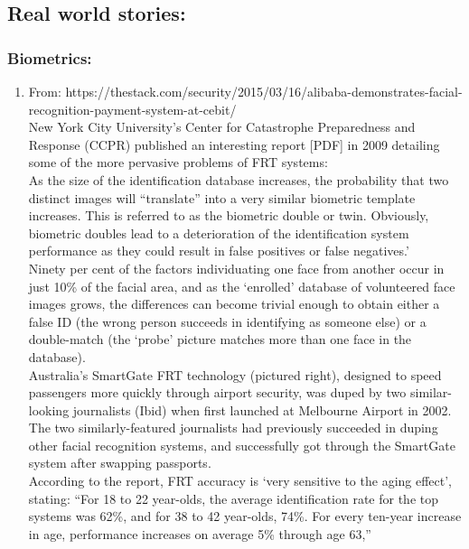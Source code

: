 \documentclass[11pt]{article}
\begin{document}
\subsection*{Real world stories:}

\subsubsection*{Biometrics:}
\begin{enumerate}
 \item From: https://thestack.com/security/2015/03/16/alibaba-demonstrates-facial-recognition-payment-system-at-cebit/\\
 New York City University’s Center for Catastrophe Preparedness and Response (CCPR) published an interesting report [PDF] in 2009 detailing some of 
the more pervasive problems of FRT systems:\\
As the size of the identification database increases, the probability that two distinct images will “translate” into a very similar biometric 
template 
increases. This is referred to as the biometric double or twin. Obviously, biometric doubles lead to a deterioration of the identification system 
performance as they could result in false positives or false negatives.’\\

Ninety per cent of the factors individuating one face from another occur in just 10\% of the facial area, and as the ‘enrolled’ database of 
volunteered face images grows, the differences can become trivial enough to obtain either a false ID (the wrong person succeeds in identifying as 
someone else) or a double-match (the ‘probe’ picture matches more than one face in the database).\\

Australia’s SmartGate FRT technology (pictured right), designed to speed passengers more quickly through airport security, was duped by two 
similar-looking journalists (Ibid) when first launched at Melbourne Airport in 2002. The two similarly-featured journalists had previously succeeded 
in duping other facial recognition systems, and successfully got through the SmartGate system after swapping passports.\\

According to the report, FRT accuracy is ‘very sensitive to the aging effect’, stating: “For 18 to 22 year-olds, the average identification rate for 
the top systems was 62\%, and for 38 to 42 year-olds, 74\%. For every ten-year increase in age, performance increases on average 5\% through age 63,”
\end{enumerate}
\end{document}
